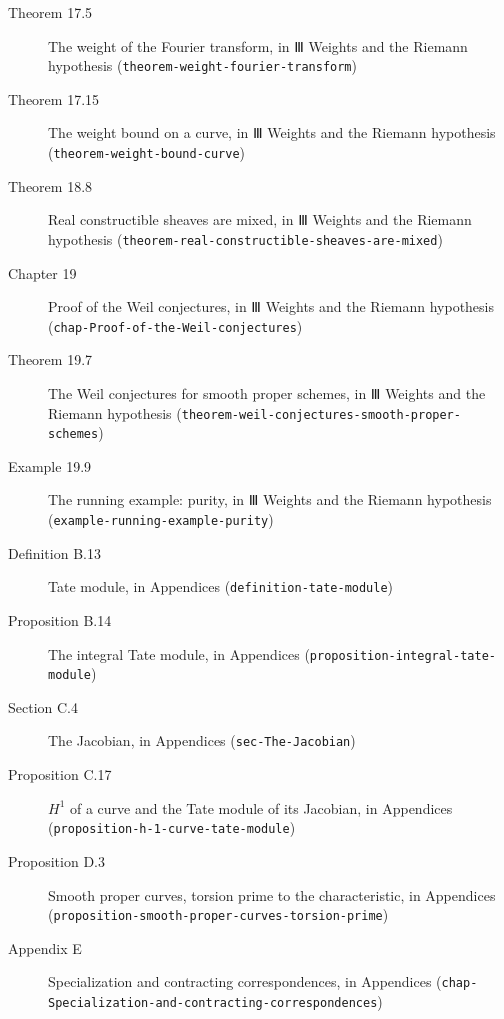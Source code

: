 \documentclass[11pt]{article}
\newcommand{\bpslug}[1]{\texttt{#1}}
\begin{document}
\begin{description}
\item[Theorem 17.5] The weight of the Fourier transform, in Ⅲ Weights and the Riemann hypothesis (\bpslug{theorem-{}\allowbreak{}weight-{}\allowbreak{}fourier-{}\allowbreak{}transform})
\item[Theorem 17.15] The weight bound on a curve, in Ⅲ Weights and the Riemann hypothesis (\bpslug{theorem-{}\allowbreak{}weight-{}\allowbreak{}bound-{}\allowbreak{}curve})
\item[Theorem 18.8] Real constructible sheaves are mixed, in Ⅲ Weights and the Riemann hypothesis (\bpslug{theorem-{}\allowbreak{}real-{}\allowbreak{}constructible-{}\allowbreak{}sheaves-{}\allowbreak{}are-{}\allowbreak{}mixed})
\item[Chapter 19] Proof of the Weil conjectures, in Ⅲ Weights and the Riemann hypothesis (\bpslug{chap-{}\allowbreak{}Proof-{}\allowbreak{}of-{}\allowbreak{}the-{}\allowbreak{}Weil-{}\allowbreak{}conjectures})
\item[Theorem 19.7] The Weil conjectures for smooth proper schemes, in Ⅲ Weights and the Riemann hypothesis (\bpslug{theorem-{}\allowbreak{}weil-{}\allowbreak{}conjectures-{}\allowbreak{}smooth-{}\allowbreak{}proper-{}\allowbreak{}schemes})
\item[Example 19.9] The running example: purity, in Ⅲ Weights and the Riemann hypothesis (\bpslug{example-{}\allowbreak{}running-{}\allowbreak{}example-{}\allowbreak{}purity})
\item[Definition B.13] Tate module, in Appendices (\bpslug{definition-{}\allowbreak{}tate-{}\allowbreak{}module})
\item[Proposition B.14] The integral Tate module, in Appendices (\bpslug{proposition-{}\allowbreak{}integral-{}\allowbreak{}tate-{}\allowbreak{}module})
\item[Section C.4] The Jacobian, in Appendices (\bpslug{sec-{}\allowbreak{}The-{}\allowbreak{}Jacobian})
\item[Proposition C.17] $H^1$ of a curve and the Tate module of its Jacobian, in Appendices (\bpslug{proposition-{}\allowbreak{}h-{}\allowbreak{}1-{}\allowbreak{}curve-{}\allowbreak{}tate-{}\allowbreak{}module})
\item[Proposition D.3] Smooth proper curves, torsion prime to the characteristic, in Appendices (\bpslug{proposition-{}\allowbreak{}smooth-{}\allowbreak{}proper-{}\allowbreak{}curves-{}\allowbreak{}torsion-{}\allowbreak{}prime})
\item[Appendix E] Specialization and contracting correspondences, in Appendices (\bpslug{chap-{}\allowbreak{}Specialization-{}\allowbreak{}and-{}\allowbreak{}contracting-{}\allowbreak{}correspondences})
\end{description}
\clearpage{}%
\end{document}
